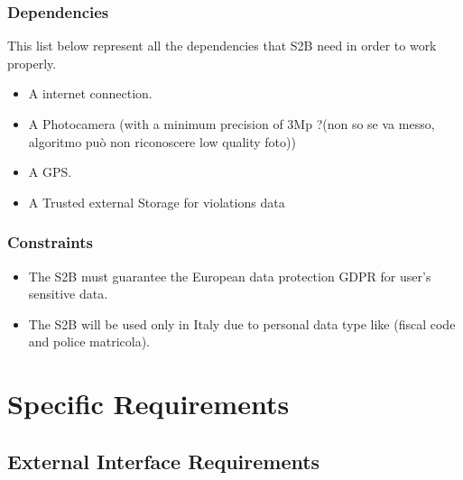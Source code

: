 \documentclass{article}
\begin{document}
\subsubsection{Dependencies}
This list below represent all the dependencies that S2B need in order to work properly.
\begin{itemize}
    \item A internet connection.
    \item A Photocamera (with a minimum precision of 3Mp ?(non so se va messo, algoritmo può non riconoscere low quality foto))
    \item A GPS.
    \item A Trusted external Storage for violations data   
\end{itemize}

\subsubsection{Constraints}
\begin{itemize}
    \item The S2B must guarantee the European data protection GDPR for user's sensitive data.
    \item The S2B will be used only in Italy due to personal data type like (fiscal code and police matricola).
\end{itemize}

\section{Specific Requirements}

\subsection{External Interface Requirements}
\end{document}

